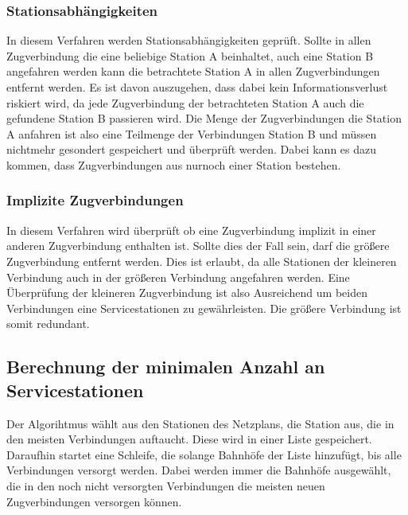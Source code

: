 \subsubsection{Stationsabhängigkeiten}
In diesem Verfahren werden Stationsabhängigkeiten geprüft. Sollte in allen Zugverbindung die eine beliebige Station A beinhaltet, auch eine Station B angefahren werden kann die betrachtete Station A in allen Zugverbindungen entfernt werden. Es ist davon auszugehen, dass dabei kein Informationsverlust riskiert wird, da jede Zugverbindung der betrachteten Station A auch die gefundene Station B passieren wird. Die Menge der Zugverbindungen die Station A anfahren ist also eine Teilmenge der Verbindungen Station B und müssen nichtmehr gesondert gespeichert und überprüft werden. Dabei kann es dazu kommen, dass Zugverbindungen aus nurnoch einer Station bestehen.\\

\subsubsection{Implizite Zugverbindungen}
In diesem Verfahren wird überprüft ob eine Zugverbindung implizit in einer anderen Zugverbindung enthalten ist. Sollte dies der Fall sein, darf die größere Zugverbindung entfernt werden. Dies ist erlaubt, da alle Stationen der kleineren Verbindung auch in der größeren Verbindung angefahren werden. Eine Überprüfung der kleineren Zugverbindung ist also Ausreichend um beiden Verbindungen eine Servicestationen zu gewährleisten. Die größere Verbindung ist somit redundant.\\

\subsection{Berechnung der minimalen Anzahl an Servicestationen}\label{ver:subsec:berechnung}
Der Algorihtmus wählt aus den Stationen des Netzplans, die Station aus, die in den meisten Verbindungen auftaucht. Diese wird in einer Liste gespeichert. Daraufhin startet eine Schleife, die solange Bahnhöfe der Liste hinzufügt, bis alle Verbindungen versorgt werden. Dabei werden immer die Bahnhöfe ausgewählt, die in den noch nicht versorgten Verbindungen die meisten neuen Zugverbindungen versorgen können.\\

